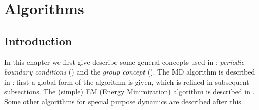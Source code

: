 %
%
%
%
%
%
%

\newcommand{\nproc}{\mbox{$M$}}
\newcommand{\natom}{\mbox{$N$}}
\newcommand{\nx}{\mbox{$n_x$}}
\newcommand{\ny}{\mbox{$n_y$}}
\newcommand{\nz}{\mbox{$n_z$}}
\newcommand{\nsgrid}{NS grid}
\newcommand{\fftgrid}{FFT grid}
\newcommand{\dgrid}{\mbox{$\delta_{grid}$}}
\newcommand{\bfv}[1]{{\mbox{\boldmath{$#1$}}}}
\newcommand{\bfm}[1]{{\bf #1}}
\newcommand{\dt}{\Delta t}
\newcommand{\rv}{\bfv{r}}
\newcommand{\vv}{\bfv{v}}
\newcommand{\F}{\bfv{F}}
\newcommand{\pb}{\bfv{p}}
\newcommand{\veps}{v_{\epsilon}}
\newcommand{\peps}{p_{\epsilon}}
\newcommand{\sinhx}[1]{\frac{\sinh{\left( #1\right)}}{#1}}
\chapter{Algorithms}
\label{ch:algorithms}
\section{Introduction}
In this chapter we first give describe some general concepts used in
{\gromacs}:  {\em periodic boundary conditions} ()
and the {\em group concept} (). The MD algorithm is
described in : first a global form of the algorithm is
given, which is refined in subsequent subsections. The (simple) EM
(Energy Minimization) algorithm is described in . Some
other algorithms for special purpose dynamics are described after
this.  

